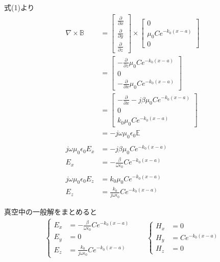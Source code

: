 \documentclass[a4paper,10pt]{bxjsarticle}
\begin{document}
式(1)より
\begin{align*}
    \nabla \times \mathbb{B} 
    & = \begin{bmatrix}
        \frac{\partial}{\partial x}\\
        \frac{\partial}{\partial y}\\
        \frac{\partial}{\partial z}
    \end{bmatrix} \times
    \begin{bmatrix}
        0 \\
        \mu_0 C e^{- k_0 (x - a)} \\
        0 
    \end{bmatrix} \\
    & = \begin{bmatrix}
        -\frac{\partial}{\partial z} \mu_0 C e^{- k_0 (x - a)} \\
        0 \\
        -\frac{\partial}{\partial x} \mu_0 C e^{- k_0 (x - a)}
    \end{bmatrix} \\
    & = \begin{bmatrix}-\frac{\partial}{\partial x}
        -j\beta \mu_0 C e^{- k_0 (x - a)} \\
        0 \\
        k_0 \mu_0 C e^{- k_0 (x - a)}
    \end{bmatrix} \\
    &= -j \omega \mu_0 \epsilon_0 \mathbb{E} \\
    \\
    j\omega \mu_0 \epsilon_0 E_x &= -j\beta \mu_0 C e^{- k_0 (x - a)} \\
    E_x &= - \frac{\beta}{\omega \epsilon_0} C e^{- k_0 (x - a)} \\
    \\
    j\omega \mu_0 \epsilon_0 E_z &= k_0 \mu_0 C e^{- k_0 (x - a)} \\
    E_z &= \frac{k_0}{j\omega \epsilon_0} C e^{- k_0 (x - a)}
\end{align*}

真空中の一般解をまとめると
\begin{align*}
    \begin{cases}
        E_x &= - \frac{\beta}{\omega \epsilon_0} C e^{- k_0 (x - a)} \\
        E_y &= 0 \\
        E_z &= \frac{k_0}{j\omega \epsilon_0} C e^{- k_0 (x - a)}
    \end{cases} \qquad
    \begin{cases}
        H_x &= 0 \\
        H_y &= C e^{- k_0 (x - a)} \\
        H_z &= 0
    \end{cases}
\end{align*}
\end{document}
